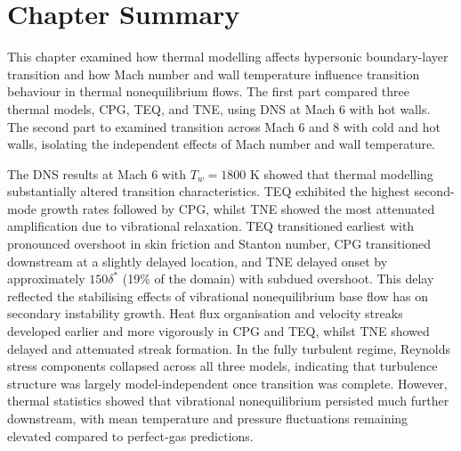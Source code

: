 


\section*{Chapter Summary}

This chapter examined how thermal modelling affects hypersonic boundary-layer transition and how Mach number and wall temperature influence transition behaviour in thermal nonequilibrium flows. The first part compared three thermal models, \gls{CPG}, \gls{TEQ}, and \gls{TNE}, using \gls{DNS} at Mach 6 with hot walls. The second part to examined transition across Mach 6 and 8 with cold and hot walls, isolating the independent effects of Mach number and wall temperature.

The \gls{DNS} results at Mach 6 with $T_w = 1800$ K showed that thermal modelling substantially altered transition characteristics. \gls{TEQ} exhibited the highest second-mode growth rates followed by \gls{CPG}, whilst \gls{TNE} showed the most attenuated amplification due to vibrational relaxation. \gls{TEQ} transitioned earliest with pronounced overshoot in skin friction and Stanton number, \gls{CPG} transitioned downstream at a slightly delayed location, and \gls{TNE} delayed onset by approximately $150\delta^*$ (19\% of the domain) with subdued overshoot. This delay reflected the stabilising effects of vibrational nonequilibrium base flow has on secondary instability growth. Heat flux organisation and velocity streaks developed earlier and more vigorously in \gls{CPG} and \gls{TEQ}, whilst \gls{TNE} showed delayed and attenuated streak formation. In the fully turbulent regime, Reynolds stress components collapsed across all three models, indicating that turbulence structure was largely model-independent once transition was complete. However, thermal statistics showed that vibrational nonequilibrium persisted much further downstream, with mean temperature and pressure fluctuations remaining elevated compared to perfect-gas predictions.

